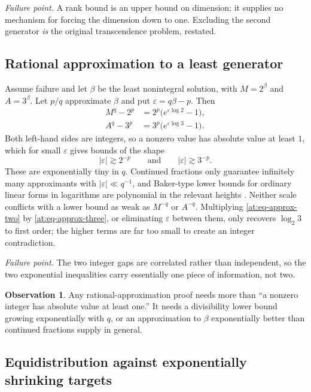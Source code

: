 \documentclass[11pt,oneside]{article}
\theoremstyle{definition}
\newtheorem{observation}[theorem]{Observation}
\theoremstyle{remark}
\begin{document}
\emph{Failure point.}  A rank bound is an upper bound on dimension; it supplies no mechanism
for forcing the dimension down to one.  Excluding the second generator \emph{is} the
original transcendence problem, restated.

\subsection{Rational approximation to a least generator}
\label{at:approx}

Assume failure and let $\beta$ be the least nonintegral solution, with $M=2^{\beta}$ and
$A=3^{\beta}$.  Let $p/q$ approximate $\beta$ and put $\varepsilon=q\beta-p$.  Then
\begin{align}
  M^{q}-2^{p} &= 2^{p}\bigl(e^{\varepsilon\log2}-1\bigr), \label{at:eq-approx-two}\\
  A^{q}-3^{p} &= 3^{p}\bigl(e^{\varepsilon\log3}-1\bigr). \label{at:eq-approx-three}
\end{align}
Both left-hand sides are integers, so a nonzero value has absolute value at least $1$, which
for small $\varepsilon$ gives bounds of the shape
\[
  |\varepsilon|\gtrsim2^{-p}
  \qquad\text{and}\qquad
  |\varepsilon|\gtrsim3^{-p}.
\]
These are exponentially tiny in $q$.  Continued fractions only guarantee infinitely many
approximants with $|\varepsilon|\ll q^{-1}$, and Baker-type lower bounds for ordinary linear
forms in logarithms are polynomial in the relevant heights
\cite{Baker1975,Waldschmidt2000}.  Neither scale conflicts with a lower bound as weak as
$M^{-q}$ or $A^{-q}$.  Multiplying \eqref{at:eq-approx-two} by \eqref{at:eq-approx-three},
or eliminating $\varepsilon$ between them, only recovers $\log_2 3$ to first order; the
higher terms are far too small to create an integer contradiction.

\emph{Failure point.}  The two integer gaps are correlated rather than independent, so the
two exponential inequalities carry essentially one piece of information, not two.

\begin{observation}
\label{at:obs-approx}
Any rational-approximation proof needs more than ``a nonzero integer has absolute value at
least one.''  It needs a divisibility lower bound growing exponentially with $q$, or an
approximation to $\beta$ exponentially better than continued fractions supply in general.
\end{observation}

\subsection{Equidistribution against exponentially shrinking targets}
\label{at:equi}
\end{document}
